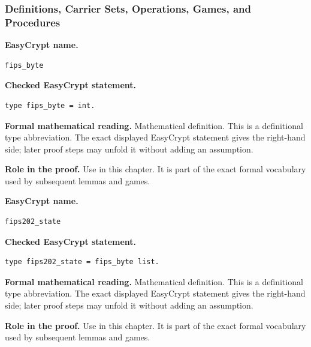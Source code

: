 \subsubsection*{Definitions, Carrier Sets, Operations, Games, and Procedures}
\begin{formaldefinition}
\noindent\textbf{EasyCrypt name.}
\begin{lstlisting}[language=EasyCrypt,basicstyle=\ttfamily\scriptsize]
fips_byte
\end{lstlisting}
\noindent\textbf{Checked EasyCrypt statement.}
\begin{lstlisting}[language=EasyCrypt,basicstyle=\ttfamily\scriptsize]
type fips_byte = int.
\end{lstlisting}
\noindent\textbf{Formal mathematical reading.}
Mathematical definition. This is a definitional type abbreviation.  The exact displayed EasyCrypt statement gives the right-hand side; later proof steps may unfold it without adding an assumption.

\noindent\textbf{Role in the proof.}
Use in this chapter. It is part of the exact formal vocabulary used by subsequent lemmas and games.

\end{formaldefinition}

\begin{formaldefinition}
\noindent\textbf{EasyCrypt name.}
\begin{lstlisting}[language=EasyCrypt,basicstyle=\ttfamily\scriptsize]
fips202_state
\end{lstlisting}
\noindent\textbf{Checked EasyCrypt statement.}
\begin{lstlisting}[language=EasyCrypt,basicstyle=\ttfamily\scriptsize]
type fips202_state = fips_byte list.
\end{lstlisting}
\noindent\textbf{Formal mathematical reading.}
Mathematical definition. This is a definitional type abbreviation.  The exact displayed EasyCrypt statement gives the right-hand side; later proof steps may unfold it without adding an assumption.

\noindent\textbf{Role in the proof.}
Use in this chapter. It is part of the exact formal vocabulary used by subsequent lemmas and games.

\end{formaldefinition}

